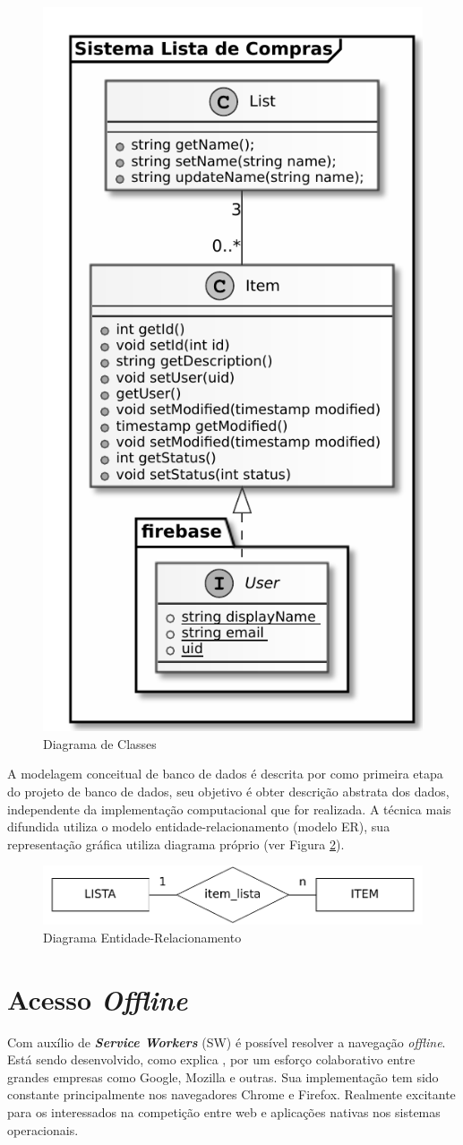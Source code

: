 \documentclass[12pt]{article}
\begin{document}
\begin{figure}[ht]
\centering
\includegraphics[width=.48\textwidth,keepaspectratio]{figures/classes.pdf}
\caption{Diagrama de Classes}
\label{fig:classes}
\end{figure}

A modelagem conceitual de banco de dados é descrita por \cite{heuser2009} como primeira etapa do projeto de banco de dados, seu objetivo é obter descrição abstrata dos dados, independente da implementação computacional que for realizada. A técnica mais difundida utiliza o modelo entidade-relacionamento (modelo ER), sua representação gráfica utiliza diagrama próprio (ver Figura \ref{fig:me}).

\begin{figure}[ht]
\centering
\includegraphics[width=.7\textwidth,keepaspectratio]{figures/mer.pdf}
\caption{Diagrama Entidade-Relacionamento}
\label{fig:me}
\end{figure}

\section{Acesso \textit{Offline}}

Com auxílio de \textbf{\textit{Service Workers}} (SW) é possível resolver a navegação \textit{offline}. Está sendo desenvolvido, como explica \cite{swfirstdraft}, por um esforço colaborativo entre grandes empresas como Google, Mozilla e outras. Sua implementação tem sido constante principalmente nos navegadores Chrome e Firefox. Realmente excitante para os interessados na competição entre web e aplicações nativas nos sistemas operacionais.
\end{document}
